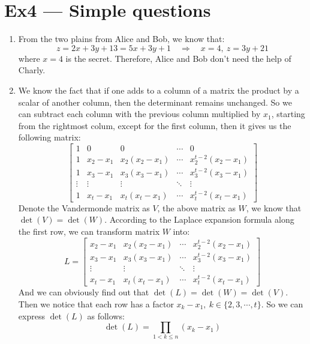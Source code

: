 \documentclass[12pt, a4paper]{article}
\begin{document}
\section*{Ex4 --- Simple questions}
\begin{enumerate}
    \item From the two plains from Alice and Bob, we know that:
          $$z = 2x + 3y + 13 = 5x + 3y + 1 \quad \Rightarrow \quad x = 4,\ z = 3y + 21$$
          where $x = 4$ is the secret. Therefore, Alice and Bob don't need the help of Charly.
    \item We know the fact that if one adds to a column of a matrix the product by a scalar of another column, 
          then the determinant remains unchanged. So we can subtract each column with the previous column multiplied by $x_1$, 
          starting from the rightmost colum, except for the first column, then it gives us the following matrix:
          $$
          \begin{bmatrix}
              1 & 0 & 0 & \cdots & 0\\
              1 & x_2 - x_1 & x_2(x_2 - x_1) & \cdots & x_2^{t-2}(x_2 - x_1)\\
              1 & x_3 - x_1 & x_3(x_3 - x_1) & \cdots & x_3^{t-2}(x_3 - x_1)\\
              \vdots & \vdots & \vdots & \ddots & \vdots\\
              1 & x_t - x_1 & x_t(x_t - x_1) & \cdots & x_t^{t-2}(x_t - x_1)
          \end{bmatrix}
          $$
          Denote the Vandermonde matrix as $V$, the above matrix as $W$, we know that $\det(V) = \det(W)$. 
          According to the Laplace expansion formula along the first row, we can transform matrix $W$ into:
          $$L = 
          \begin{bmatrix}
              x_2 - x_1 & x_2(x_2 - x_1) & \cdots & x_2^{t-2}(x_2 - x_1)\\
              x_3 - x_1 & x_3(x_3 - x_1) & \cdots & x_3^{t-2}(x_3 - x_1)\\
              \vdots & \vdots & \ddots & \vdots\\
              x_t - x_1 & x_t(x_t - x_1) & \cdots & x_t^{t-2}(x_t - x_1)
          \end{bmatrix}
          $$
          And we can obviously find out that $\det(L) = \det(W) = \det(V)$. 
          Then we notice that each row has a factor $x_k - x_1,\ k\in \{2,3,\cdots,t\}$. 
          So we can express $\det(L)$ as follows:
          $$
          \det(L) = \prod_{1<k\leq n} (x_k - x_1) 
$$
\end{enumerate}
\end{document}
